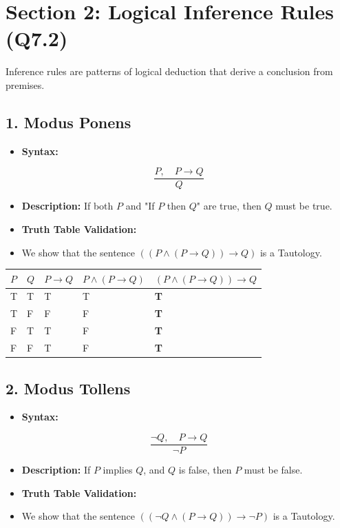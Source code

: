 \section{Section 2: Logical Inference Rules (Q7.2)}

Inference rules are patterns of logical deduction that derive a conclusion from premises.

\subsection{1. Modus Ponens}
\begin{itemize}
  \item   \textbf{Syntax:}
\end{itemize}
    \[ \frac{P, \quad P \rightarrow Q}{Q} \]
\begin{itemize}
  \item   \textbf{Description:} If both $P$ and "If $P$ then $Q$" are true, then $Q$ must be true.
  \item   \textbf{Truth Table Validation:}
  \item   We show that the sentence $((P \land (P \rightarrow Q)) \rightarrow Q)$ is a Tautology.
\end{itemize}

\begin{table}[H]
\centering
\begin{tabular}{|p{}|p{}|p{}|p{}|p{}|}
\hline
$P$ & $Q$ & $P \rightarrow Q$ & $P \land (P \rightarrow Q)$ & $(P \land (P \rightarrow Q)) \rightarrow Q$ \\
\hline
T & T & T & T & \textbf{T} \\
\hline
T & F & F & F & \textbf{T} \\
\hline
F & T & T & F & \textbf{T} \\
\hline
F & F & T & F & \textbf{T} \\
\hline
\end{tabular}
\end{table}


\subsection{2. Modus Tollens}
\begin{itemize}
  \item   \textbf{Syntax:}
\end{itemize}
    \[ \frac{\neg Q, \quad P \rightarrow Q}{\neg P} \]
\begin{itemize}
  \item   \textbf{Description:} If $P$ implies $Q$, and $Q$ is false, then $P$ must be false.
  \item   \textbf{Truth Table Validation:}
  \item   We show that the sentence $((\neg Q \land (P \rightarrow Q)) \rightarrow \neg P)$ is a Tautology.
\end{itemize}

